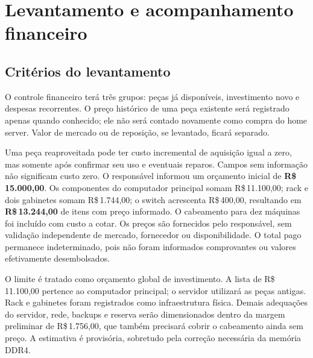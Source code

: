 \documentclass[11pt,a4paper,oneside]{report}
\newcommand{\dinheiro}[1]{R\$\,#1}
\begin{document}
\chapter{Levantamento e acompanhamento financeiro}
\section{Critérios do levantamento}
O controle financeiro terá três grupos: peças já disponíveis, investimento
novo e despesas recorrentes. O preço histórico de uma peça existente será
registrado apenas quando conhecido; ele não será contado novamente como compra
do home server. Valor de mercado ou de reposição, se levantado, ficará separado.

Uma peça reaproveitada pode ter custo incremental de aquisição igual a zero,
mas somente após confirmar seu uso e eventuais reparos. Campos sem informação
não significam custo zero. O responsável informou um orçamento inicial de
\textbf{\dinheiro{15.000,00}}. Os componentes do computador principal somam
\dinheiro{11.100,00}; rack e dois gabinetes somam \dinheiro{1.744,00};
o switch acrescenta \dinheiro{400,00}, resultando em
\textbf{\dinheiro{13.244,00}} de itens com preço informado.
O cabeamento para dez máquinas foi incluído com custo a cotar.
Os preços são fornecidos pelo responsável,
sem validação independente de mercado, fornecedor ou disponibilidade.
O total pago permanece indeterminado, pois não foram informados comprovantes
ou valores efetivamente desembolsados.

O limite é tratado como orçamento global de investimento. A lista de
\dinheiro{11.100,00} pertence ao computador principal; o servidor utilizará
as peças antigas. Rack e gabinetes foram registrados como infraestrutura física.
Demais adequações do servidor, rede, backups e reserva serão dimensionados
dentro da margem preliminar de \dinheiro{1.756,00}, que também precisará cobrir
o cabeamento ainda sem preço.
A estimativa é provisória, sobretudo pela correção necessária da memória DDR4.
\end{document}
